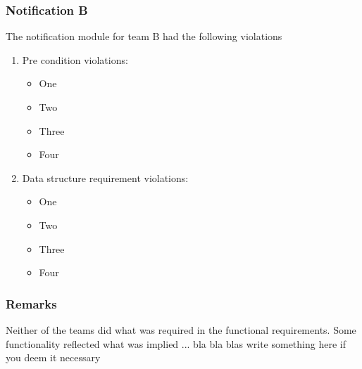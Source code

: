 \subsubsection*{Notification B}
The notification module for team B had the following violations
\begin{enumerate}
	\item Pre condition violations:
	\begin{itemize}
		\item One 
		\item Two 
		\item Three 
		\item Four 
	\end{itemize}
	\item Data structure requirement violations:
	\begin{itemize}
		\item One 
		\item Two 
		\item Three 
		\item Four 
	\end{itemize}
\end{enumerate}
\subsubsection*{Remarks}
Neither of the teams did what was required in the functional requirements. Some functionality reflected what was implied ... bla bla blas write something here if you deem it necessary
